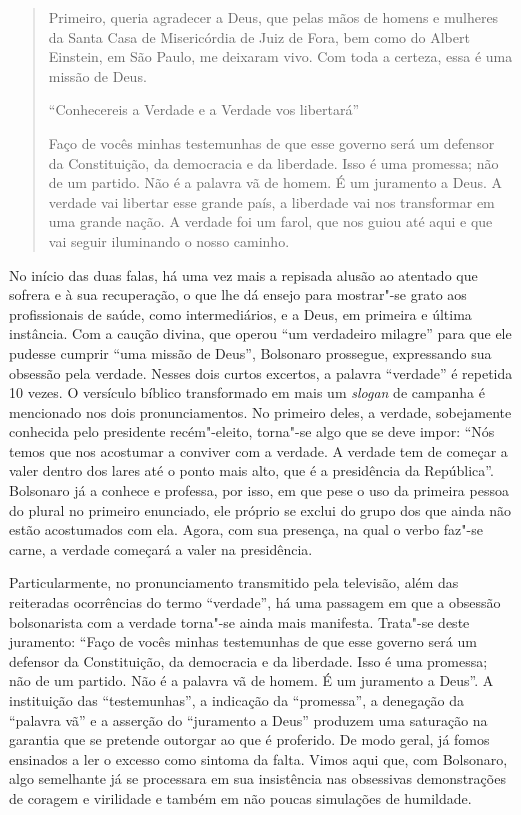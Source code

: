 \begin{quote}
Primeiro, queria agradecer a Deus, que pelas mãos de homens e mulheres
da Santa Casa de Misericórdia de Juiz de Fora, bem como do Albert
Einstein, em São Paulo, me deixaram vivo. Com toda a certeza, essa é uma
missão de Deus.

``Conhecereis a Verdade e a Verdade vos libertará''

Faço de vocês minhas testemunhas de que esse governo será um defensor da
Constituição, da democracia e da liberdade. Isso é uma promessa; não de
um partido. Não é a palavra vã de homem. É um juramento a Deus. A
verdade vai libertar esse grande país, a liberdade vai nos transformar
em uma grande nação. A verdade foi um farol, que nos guiou até aqui e
que vai seguir iluminando o nosso caminho.
\end{quote}

No início das duas falas, há uma vez mais a repisada alusão ao atentado
que sofrera e à sua recuperação, o que lhe dá ensejo para mostrar"-se
grato aos profissionais de saúde, como intermediários, e a Deus, em
primeira e última instância. Com a caução divina, que operou ``um
verdadeiro milagre'' para que ele pudesse cumprir ``uma missão de
Deus'', Bolsonaro prossegue, expressando sua obsessão pela verdade.
Nesses dois curtos excertos, a palavra ``verdade'' é repetida 10 vezes.
O versículo bíblico transformado em mais um \emph{slogan} de campanha é
mencionado nos dois pronunciamentos. No primeiro deles, a verdade,
sobejamente conhecida pelo presidente recém"-eleito, torna"-se algo que se
deve impor: ``Nós temos que nos acostumar a conviver com a verdade. A
verdade tem de começar a valer dentro dos lares até o ponto mais alto,
que é a presidência da República''. Bolsonaro já a conhece e professa,
por isso, em que pese o uso da primeira pessoa do plural no primeiro
enunciado, ele próprio se exclui do grupo dos que ainda não estão
acostumados com ela. Agora, com sua presença, na qual o verbo faz"-se
carne, a verdade começará a valer na presidência.

Particularmente, no pronunciamento transmitido pela televisão, além das
reiteradas ocorrências do termo ``verdade'', há uma passagem em que a
obsessão bolsonarista com a verdade torna"-se ainda mais manifesta.
Trata"-se deste juramento: ``Faço de vocês minhas testemunhas de que esse
governo será um defensor da Constituição, da democracia e da liberdade.
Isso é uma promessa; não de um partido. Não é a palavra vã de homem. É
um juramento a Deus''. A instituição das ``testemunhas'', a indicação da
``promessa'', a denegação da ``palavra vã'' e a asserção do ``juramento
a Deus'' produzem uma saturação na garantia que se pretende outorgar ao
que é proferido. De modo geral, já fomos ensinados a ler o excesso como
sintoma da falta. Vimos aqui que, com Bolsonaro, algo semelhante já se
processara em sua insistência nas obsessivas demonstrações de coragem e
virilidade e também em não poucas simulações de humildade.

